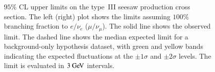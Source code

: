 \begin{figure}[htbp]
  \centering
  \caption{$95 \%$ CL upper limits on the type~III seesaw production cross section. The left (right) plot shows the limits assuming $100\%$ branching fraction to $e/\nu_e$ ($\mu/\nu_{\mu}$). The solid line shows the observed limit. The dashed line shows the median expected limit for a background-only hypothesis dataset, with green and yellow bands indicating the expected fluctuations at the $\pm1\sigma$ and $\pm 2 \sigma$ levels. The limit is evaluated in $3 \GeV$ intervals.}
  \label{fig:T3SSLimit}
\end{figure}

